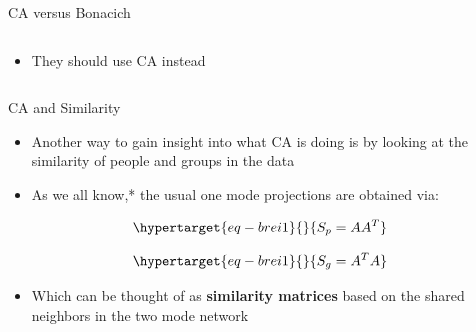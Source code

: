 \documentclass[
  ignorenonframetext,
]{beamer}
\providecommand{\tightlist}{%
  \setlength{\itemsep}{0pt}\setlength{\parskip}{0pt}}\usepackage{longtable,booktabs,array}
\begin{document}
\begin{frame}{CA versus Bonacich}
\begin{columns}[T]
\begin{column}{0.5\textwidth}
\begin{itemize}
  \begin{itemize}
  \tightlist
  \item
    They should use CA instead
  \end{itemize}
\end{itemize}
\end{column}
\end{columns}

\end{frame}

\begin{frame}{CA and Similarity}
\protect\hypertarget{ca-and-similarity}{}
\begin{itemize}
\item
  Another way to gain insight into what CA is doing is by looking at the
  similarity of people and groups in the data
\item
  As we all know,* the usual one mode projections are obtained via:
\end{itemize}

\begin{equation}\protect\hypertarget{eq-brei1}{}{
S_p = AA^T
}\label{eq-brei1}\end{equation}

\begin{equation}\protect\hypertarget{eq-brei1}{}{
S_g = A^TA
}\label{eq-brei1}\end{equation}

\begin{itemize}
\tightlist
\item
  Which can be thought of as \textbf{similarity matrices} based on the
  shared neighbors in the two mode network
\end{itemize}

\end{frame}
\end{document}
